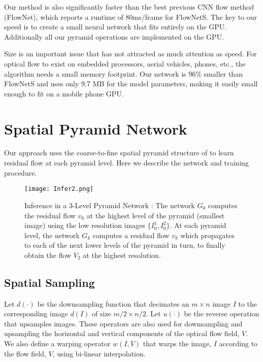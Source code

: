 \documentclass[10pt,twocolumn,letterpaper]{article}
\begin{document}
Our method is also significantly faster than the best previous CNN flow method (FlowNet), which reports a runtime of 80ms/frame for FlowNetS. 
The key to our speed is to create a small neural network that fits entirely on the GPU. 
Additionally all our pyramid operations are implemented on the GPU.

Size is an important issue that has not attracted as much attention as speed.
For optical flow to exist on embedded processors, aerial vehicles, phones, etc., the algorithm needs a small memory footprint.
Our network is 96\% smaller than FlowNetS and uses only 9.7 MB for the model parameters, making it easily small enough to fit on a mobile phone GPU.


\section{Spatial Pyramid Network}   
Our approach uses the coarse-to-fine spatial pyramid structure of \cite{denton2015deep} to learn residual flow at each pyramid level. 
Here we describe the network and training procedure. %

\begin{figure*}
\centerline{
\texttt{[image: Infer2.png]}
}
\caption{Inference in a 3-Level Pyramid Network \cite{denton2015deep}: The network $G_0$ computes the residual flow $v_0$ at the highest level of the pyramid (smallest image) using the low resolution images $\{I_0^1, I_0^2\}$. At each pyramid level, the network $G_k$ computes a residual flow $v_k$ which propagates to each of the next lower levels of the pyramid in turn, to finally obtain the flow $V_2$ at the highest resolution.}
\label{fig:infer}
\end{figure*}

\subsection{Spatial Sampling}
Let $d(\cdot)$ be the downsampling function that decimates an $m \times n$ image $I$ to the corresponding image $d(I)$ of size $m/2 \times n/2$. Let $u(\cdot)$ be the reverse operation that upsamples images. These operators are also used for downsampling and upsampling the horizontal and vertical components of the optical flow field, $V$. 
We also define a warping operator $w(I,V)$ that warps the image, $I$ according to the flow field, $V$, using  bi-linear interpolation.
\end{document}
